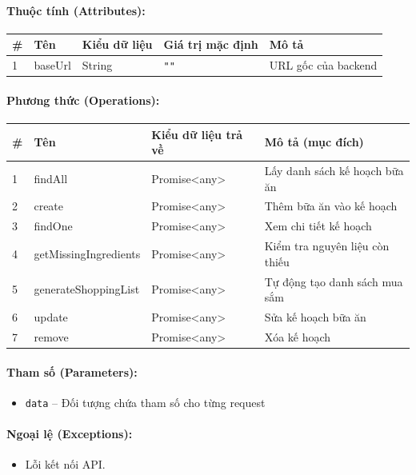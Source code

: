 \documentclass[12pt,a4paper]{article}
\begin{document}
\paragraph{Thuộc tính (Attributes):}
\begin{longtable}{|p{0.6cm}|p{2.8cm}|p{2.2cm}|p{1.8cm}|p{5.8cm}|}
\hline
\textbf{\#} & \textbf{Tên} & \textbf{Kiểu dữ liệu} & \textbf{Giá trị mặc định} & \textbf{Mô tả} \\ \hline
\endhead
1 & baseUrl & String & \texttt{""} & URL gốc của backend \\ \hline
\end{longtable}

\paragraph{Phương thức (Operations):}
\begin{longtable}{|p{0.6cm}|p{3.8cm}|p{2.6cm}|p{6.5cm}|}
\hline
\textbf{\#} & \textbf{Tên} & \textbf{Kiểu dữ liệu trả về} & \textbf{Mô tả (mục đích)} \\ \hline
\endhead
1 & findAll & Promise\textless{}any\textgreater{} & Lấy danh sách kế hoạch bữa ăn \\ \hline
2 & create & Promise\textless{}any\textgreater{} & Thêm bữa ăn vào kế hoạch \\ \hline
3 & findOne & Promise\textless{}any\textgreater{} & Xem chi tiết kế hoạch \\ \hline
4 & getMissingIngredients & Promise\textless{}any\textgreater{} & Kiểm tra nguyên liệu còn thiếu \\ \hline
5 & generateShoppingList & Promise\textless{}any\textgreater{} & Tự động tạo danh sách mua sắm \\ \hline
6 & update & Promise\textless{}any\textgreater{} & Sửa kế hoạch bữa ăn \\ \hline
7 & remove & Promise\textless{}any\textgreater{} & Xóa kế hoạch \\ \hline
\end{longtable}

\paragraph{Tham số (Parameters):}
\begin{itemize}[leftmargin=*]
    \item \texttt{data} – Đối tượng chứa tham số cho từng request
\end{itemize}


\paragraph{Ngoại lệ (Exceptions):}
\begin{itemize}[leftmargin=*]
    \item Lỗi kết nối API.
\end{itemize}
\end{document}
